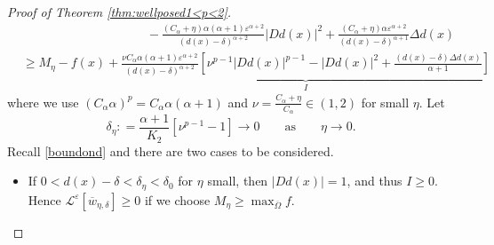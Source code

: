 \documentclass[11pt,reqno]{amsart}
\numberwithin{figure}{section}
\theoremstyle{plain}
\theoremstyle{remark}
\numberwithin{equation}{section}
\begin{document}
\begin{appendices}
\begin{proof} [Proof of Theorem \ref{thm:wellposed1<p<2}]
\begin{align*}
    & \qquad\qquad\qquad\qquad\qquad - \frac{(C_\alpha+\eta)\alpha(\alpha+1)\varepsilon^{\alpha+2}}{(d(x)-\delta)^{\alpha+2}}|D d(x)|^2 + \frac{(C_\alpha+\eta)\alpha \varepsilon^{\alpha+2}}{(d(x)-\delta)^{\alpha+1}}\Delta d(x)\\
    &\geq M_\eta - f(x) + \underbrace{\frac{\nu C_\alpha\alpha(\alpha+1)\varepsilon^{\alpha+2}}{(d(x)-\delta)^{\alpha+2}}\left[\nu^{p-1}|Dd(x)|^{p-1} - |Dd(x)|^2 + \frac{(d(x)-\delta)\Delta d(x)}{\alpha+1}\right]}_{I}
\end{align*}
where we use $(C_\alpha\alpha)^p = C_\alpha\alpha(\alpha+1)$ and $\nu = \frac{C_\alpha+\eta}{C_\alpha} \in (1,2)$ for small $\eta$. Let
\begin{equation*}
    \delta_\eta : = \frac{\alpha+1}{K_2}\left[\nu^{p-1}-1\right] \to 0 \qquad\text{as}\qquad \eta \to 0.
\end{equation*}
Recall \eqref{boundond} and there are two cases to be considered.
\begin{itemize}
    \item If $0< d(x)-\delta <\delta_\eta < \delta_0$ for $\eta$ small, then $|Dd(x)| = 1$, and thus $I\geq 0$. Hence $\mathcal{L}^\varepsilon\left[\overline{w}_{\eta,\delta}\right]\geq 0$ if we choose $M_\eta \geq \max_{\overline{\Omega}} f$.
    

\end{itemize}
\end{proof}
\end{appendices}
\end{document}
